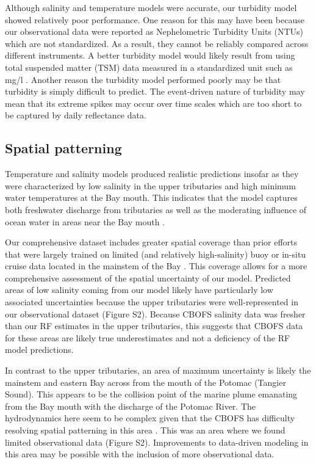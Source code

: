 \documentclass{article}
\begin{document}
Although salinity and temperature models were accurate, our turbidity model showed relatively poor performance. One reason for this may have been because our observational data were reported as Nephelometric Turbidity Units (NTUs) which are not standardized. As a result, they cannot be reliably compared across different instruments. A better turbidity model would likely result from using total suspended matter (TSM) data measured in a standardized unit such as mg/l \citep{ondrusekDevelopmentNewOptical2012}. Another reason the turbidity model performed poorly may be that turbidity is simply difficult to predict. The event-driven nature of turbidity may mean that its extreme spikes may occur over time scales which are too short to be captured by daily reflectance data.
 

\subsection{Spatial patterning}

Temperature and salinity models produced realistic predictions insofar as they were characterized by low salinity in the upper tributaries and high minimum water temperatures at the Bay mouth. This indicates that the model captures both freshwater discharge from tributaries as well as the moderating influence of ocean water in areas near the Bay mouth \citep{dingSpatiotemporalPatternsWater2015}.

Our comprehensive dataset includes greater spatial coverage than prior efforts that were  largely trained on limited (and relatively high-salinity) buoy or in-situ cruise data located in the mainstem of the Bay \citep{vogelAssessingSatelliteSea2016, geigerSatellitederivedCoastalOcean2013, ondrusekDevelopmentNewOptical2012}. This coverage allows for a more comprehensive assessment of the spatial uncertainty of our model. Predicted areas of low salinity coming from our model likely have particularly low associated uncertainties because the upper tributaries were well-represented in our observational dataset (Figure S2). Because CBOFS salinity data was fresher than our RF estimates in the upper tributaries, this suggests that CBOFS data for these areas are likely true underestimates and not a deficiency of the RF model predictions.

In contrast to the upper tributaries, an area of maximum uncertainty is likely the mainstem and eastern Bay across from the mouth of the Potomac (Tangier Sound). This appears to be the collision point of the marine plume emanating from the Bay mouth with the discharge of the Potomac River. The hydrodynamics here seem to be complex given that the CBOFS has difficulty resolving spatial patterning in this area \citep{lanerolle2011second}. This was an area where we found limited observational data (Figure S2). Improvements to data-driven modeling in this area may be possible with the inclusion of more observational data.
\end{document}
